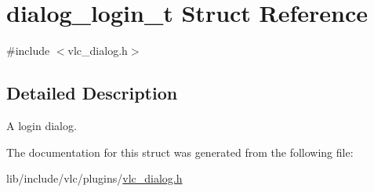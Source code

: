 \hypertarget{structdialog__login__t}{}\section{dialog\+\_\+login\+\_\+t Struct Reference}
\label{structdialog__login__t}


{\ttfamily \#include $<$vlc\+\_\+dialog.\+h$>$}



\subsection{Detailed Description}
A login dialog. 

The documentation for this struct was generated from the following file\+:\begin{DoxyCompactItemize}
\item 
lib/include/vlc/plugins/\hyperlink{vlc__dialog_8h}{vlc\+\_\+dialog.\+h}\end{DoxyCompactItemize}
